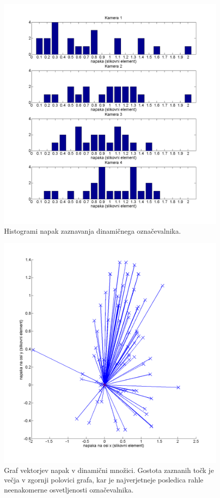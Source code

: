 \documentclass[a4paper, 12pt]{book}
\begin{document}
\begin{figure}
\centering
\includegraphics[width=\textwidth,height=\textheight,keepaspectratio]{marker_detection_dynamic_bar.png}
\caption{Histogrami napak zaznavanja dinamičnega označevalnika.}
\label{marker_detection_dynamic_bar}
\end{figure}

\begin{figure}
\centering
\includegraphics[width=\textwidth,height=\textheight,keepaspectratio]{marker_detection_dynamic_errors.png}
\caption{Graf vektorjev napak v dinamični množici. Gostota zaznanih točk je večja v zgornji polovici grafa, kar je najverjetneje posledica rahle neenakomerne osvetljenosti označevalnika.}
\label{marker_detection_dynamic_errors}
\end{figure}
\end{document}
